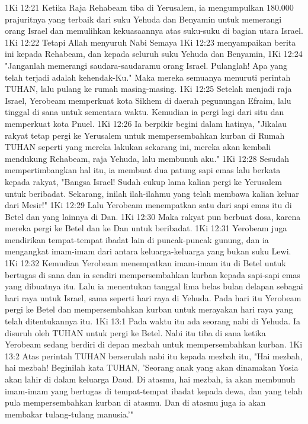 1Ki 12:21  Ketika Raja Rehabeam tiba di Yerusalem, ia mengumpulkan 180.000 prajuritnya yang terbaik dari suku Yehuda dan Benyamin untuk memerangi orang Israel dan memulihkan kekuasaannya atas suku-suku di bagian utara Israel.
1Ki 12:22  Tetapi Allah menyuruh Nabi Semaya
1Ki 12:23  menyampaikan berita ini kepada Rehabeam, dan kepada seluruh suku Yehuda dan Benyamin,
1Ki 12:24  "Janganlah memerangi saudara-saudaramu orang Israel. Pulanglah! Apa yang telah terjadi adalah kehendak-Ku." Maka mereka semuanya menuruti perintah TUHAN, lalu pulang ke rumah masing-masing.
1Ki 12:25  Setelah menjadi raja Israel, Yerobeam memperkuat kota Sikhem di daerah pegunungan Efraim, lalu tinggal di sana untuk sementara waktu. Kemudian ia pergi lagi dari situ dan memperkuat kota Pnuel.
1Ki 12:26  Ia berpikir begini dalam hatinya, "Jikalau rakyat tetap pergi ke Yerusalem untuk mempersembahkan kurban di Rumah TUHAN seperti yang mereka lakukan sekarang ini, mereka akan kembali mendukung Rehabeam, raja Yehuda, lalu membunuh aku."
1Ki 12:28  Sesudah mempertimbangkan hal itu, ia membuat dua patung sapi emas lalu berkata kepada rakyat, "Bangsa Israel! Sudah cukup lama kalian pergi ke Yerusalem untuk beribadat. Sekarang, inilah ilah-ilahmu yang telah membawa kalian keluar dari Mesir!"
1Ki 12:29  Lalu Yerobeam menempatkan satu dari sapi emas itu di Betel dan yang lainnya di Dan.
1Ki 12:30  Maka rakyat pun berbuat dosa, karena mereka pergi ke Betel dan ke Dan untuk beribadat.
1Ki 12:31  Yerobeam juga mendirikan tempat-tempat ibadat lain di puncak-puncak gunung, dan ia mengangkat imam-imam dari antara keluarga-keluarga yang bukan suku Lewi.
1Ki 12:32  Kemudian Yerobeam menempatkan imam-imam itu di Betel untuk bertugas di sana dan ia sendiri mempersembahkan kurban kepada sapi-sapi emas yang dibuatnya itu. Lalu ia menentukan tanggal lima belas bulan delapan sebagai hari raya untuk Israel, sama seperti hari raya di Yehuda. Pada hari itu Yerobeam pergi ke Betel dan mempersembahkan kurban untuk merayakan hari raya yang telah ditentukannya itu.
1Ki 13:1  Pada waktu itu ada seorang nabi di Yehuda. Ia disuruh oleh TUHAN untuk pergi ke Betel. Nabi itu tiba di sana ketika Yerobeam sedang berdiri di depan mezbah untuk mempersembahkan kurban.
1Ki 13:2  Atas perintah TUHAN berserulah nabi itu kepada mezbah itu, "Hai mezbah, hai mezbah! Beginilah kata TUHAN, 'Seorang anak yang akan dinamakan Yosia akan lahir di dalam keluarga Daud. Di atasmu, hai mezbah, ia akan membunuh imam-imam yang bertugas di tempat-tempat ibadat kepada dewa, dan yang telah pula mempersembahkan kurban di atasmu. Dan di atasmu juga ia akan membakar tulang-tulang manusia.'"
